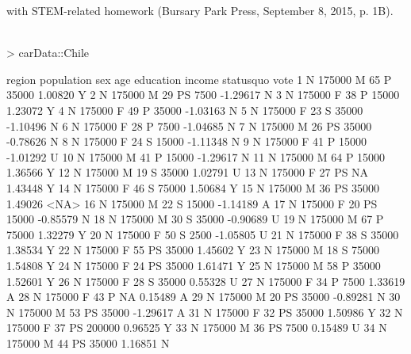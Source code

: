 \documentclass{article}
\begin{document}
 with STEM-related homework (Bursary Park Press, September 8, 2015, p. 1B).
\textit{\\\\}
\begin{Schunk}
\begin{Sinput}
> carData::Chile
\end{Sinput}
\begin{Soutput}
     region population sex age education income statusquo vote
1         N     175000   M  65         P  35000   1.00820    Y
2         N     175000   M  29        PS   7500  -1.29617    N
3         N     175000   F  38         P  15000   1.23072    Y
4         N     175000   F  49         P  35000  -1.03163    N
5         N     175000   F  23         S  35000  -1.10496    N
6         N     175000   F  28         P   7500  -1.04685    N
7         N     175000   M  26        PS  35000  -0.78626    N
8         N     175000   F  24         S  15000  -1.11348    N
9         N     175000   F  41         P  15000  -1.01292    U
10        N     175000   M  41         P  15000  -1.29617    N
11        N     175000   M  64         P  15000   1.36566    Y
12        N     175000   M  19         S  35000   1.02791    U
13        N     175000   F  27        PS     NA   1.43448    Y
14        N     175000   F  46         S  75000   1.50684    Y
15        N     175000   M  36        PS  35000   1.49026 <NA>
16        N     175000   M  22         S  15000  -1.14189    A
17        N     175000   F  20        PS  15000  -0.85579    N
18        N     175000   M  30         S  35000  -0.90689    U
19        N     175000   M  67         P  75000   1.32279    Y
20        N     175000   F  50         S   2500  -1.05805    U
21        N     175000   F  38         S  35000   1.38534    Y
22        N     175000   F  55        PS  35000   1.45602    Y
23        N     175000   M  18         S  75000   1.54808    Y
24        N     175000   F  24        PS  35000   1.61471    Y
25        N     175000   M  58         P  35000   1.52601    Y
26        N     175000   F  28         S  35000   0.55328    U
27        N     175000   F  34         P   7500   1.33619    A
28        N     175000   F  43         P     NA   0.15489    A
29        N     175000   M  20        PS  35000  -0.89281    N
30        N     175000   M  53        PS  35000  -1.29617    A
31        N     175000   F  32        PS  35000   1.50986    Y
32        N     175000   F  37        PS 200000   0.96525    Y
33        N     175000   M  36        PS   7500   0.15489    U
34        N     175000   M  44        PS  35000   1.16851    N

\end{Soutput}
\end{Schunk}
\end{document}
